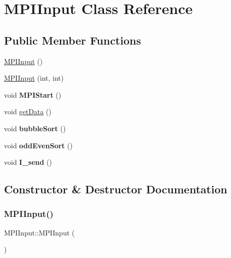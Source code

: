 \hypertarget{classMPIInput}{}\section{M\+P\+I\+Input Class Reference}
\label{classMPIInput}
\subsection*{Public Member Functions}
\begin{DoxyCompactItemize}
\item 
\hyperlink{classMPIInput_a1fd40b314f5e63f0948050dd687f2d6d}{M\+P\+I\+Input} ()
\item 
\hyperlink{classMPIInput_aad9097968754daede74b4e9931f58c8a}{M\+P\+I\+Input} (int, int)
\item 
\mbox{\label{classMPIInput_a5204b6d3bea6d1d6110b6d180da43e07}} 
void {\bfseries M\+P\+I\+Start} ()
\item 
void \hyperlink{classMPIInput_ab573f01916c4e35072009b95602a1399}{get\+Data} ()
\item 
\mbox{\label{classMPIInput_a03c8faee4d48167f2ab33b52fad7e5ea}} 
void {\bfseries bubble\+Sort} ()
\item 
\mbox{\label{classMPIInput_a1c6165f90d30a3988eba3b9cea5afefa}} 
void {\bfseries odd\+Even\+Sort} ()
\item 
\mbox{\label{classMPIInput_ab90ddedf8faad1bfeb850d6303af50a5}} 
void {\bfseries I\+\_\+send} ()
\end{DoxyCompactItemize}


\subsection{Constructor \& Destructor Documentation}
\mbox{\label{classMPIInput_a1fd40b314f5e63f0948050dd687f2d6d}} 
\subsubsection{\texorpdfstring{M\+P\+I\+Input()}{MPIInput()}\hspace{0.1cm}{\footnotesize\ttfamily [1/2]}}
{\footnotesize\ttfamily M\+P\+I\+Input\+::\+M\+P\+I\+Input (\begin{DoxyParamCaption}{ }\end{DoxyParamCaption})}

